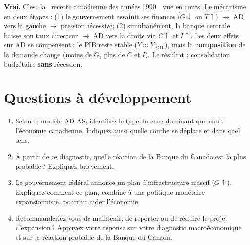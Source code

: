 

\begin{reponse}
\textbf{Vrai.} C'est la \guillemotleft~recette canadienne des années 1990~\guillemotright\ vue en cours. Le mécanisme en deux étapes : (1) le gouvernement assainit ses finances ($G \downarrow$ ou $T \uparrow$) $\to$ AD vers la gauche $\to$ pression récessive; (2) simultanément, la banque centrale baisse son taux directeur $\to$ AD vers la droite via $C \uparrow$ et $I \uparrow$. Les deux effets sur AD se compensent : le PIB reste stable ($Y \approx Y_{\text{POT}}$), mais la \textbf{composition} de la demande change (moins de $G$, plus de $C$ et $I$). Le résultat : consolidation budgétaire \textbf{sans} récession.
\end{reponse}

\section{Questions à développement}

\setcounter{shortcounter}{0}


\begin{enumerate}[label=(\alph*)]
   \item Selon le modèle AD-AS, identifiez le type de choc dominant que subit l'économie canadienne. Indiquez aussi quelle courbe se déplace et dans quel sens.
   \item À partir de ce diagnostic, quelle réaction de la Banque du Canada est la plus probable\,? Expliquez brièvement.
   \item Le gouvernement fédéral annonce un plan d'infrastructure massif ($G \uparrow$). Expliquez comment ce plan, combiné à une politique monétaire expansionniste, pourrait aider l'économie.
   \item Recommanderiez-vous de maintenir, de reporter ou de réduire le projet d'expansion\,? Appuyez votre réponse sur votre diagnostic macroéconomique et sur la réaction probable de la Banque du Canada.
\end{enumerate}

